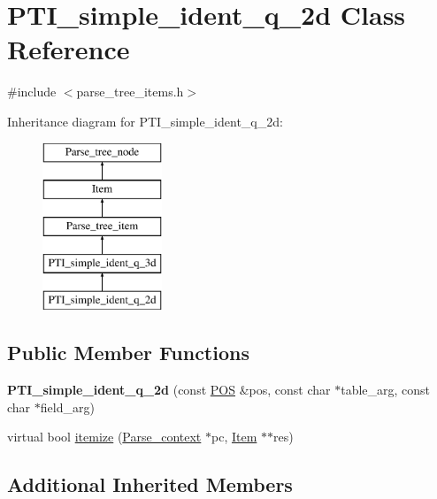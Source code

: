 \hypertarget{classPTI__simple__ident__q__2d}{}\section{P\+T\+I\+\_\+simple\+\_\+ident\+\_\+q\+\_\+2d Class Reference}
\label{classPTI__simple__ident__q__2d}


{\ttfamily \#include $<$parse\+\_\+tree\+\_\+items.\+h$>$}

Inheritance diagram for P\+T\+I\+\_\+simple\+\_\+ident\+\_\+q\+\_\+2d\+:\begin{figure}[H]
\begin{center}
\leavevmode
\includegraphics[height=5.000000cm]{classPTI__simple__ident__q__2d}
\end{center}
\end{figure}
\subsection*{Public Member Functions}
\begin{DoxyCompactItemize}
\item 
\mbox{\label{classPTI__simple__ident__q__2d_a5803eaf7838107006d3b6f1a60207ccd}} 
{\bfseries P\+T\+I\+\_\+simple\+\_\+ident\+\_\+q\+\_\+2d} (const \mbox{\hyperlink{structYYLTYPE}{P\+OS}} \&pos, const char $\ast$table\+\_\+arg, const char $\ast$field\+\_\+arg)
\item 
virtual bool \mbox{\hyperlink{classPTI__simple__ident__q__2d_a1cd2321d602048802e283a067c2bb986}{itemize}} (\mbox{\hyperlink{structParse__context}{Parse\+\_\+context}} $\ast$pc, \mbox{\hyperlink{classItem}{Item}} $\ast$$\ast$res)
\end{DoxyCompactItemize}
\subsection*{Additional Inherited Members}


